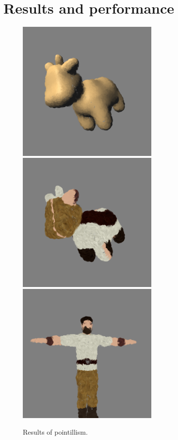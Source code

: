 \chapter{Results and performance}

\begin{figure}
    \begin{center}
    \includegraphics[width=70mm, height=70mm]{Resultats/spotPoint/final.png}
    \includegraphics[width=70mm, height=70mm]{Resultats/spotPoint/final2.png}
    \includegraphics[width=70mm, height=70mm]{Resultats/pointCharacter/final.png}
    \end{center}
    \caption{Results of pointillism.}
    \label{results_point}
\end{figure}

